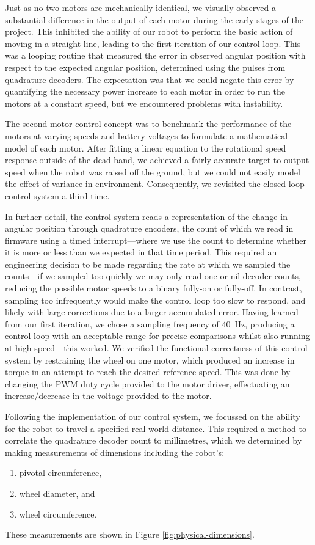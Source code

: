 \documentclass[conference]{IEEEtran}
\begin{document}
Just as no two motors are mechanically identical, we visually observed a substantial difference in the output of each motor during the early stages of the project.
This inhibited the ability of our robot to perform the basic action of moving in a straight line, leading to the first iteration of our control loop.
This was a looping routine that measured the error in observed angular position with respect to the expected angular position, determined using the pulses from quadrature decoders.
The expectation was that we could negate this error by quantifying the necessary power increase to each motor in order to run the motors at a constant speed, but we encountered problems with instability.

The second motor control concept was to benchmark the performance of the motors at varying speeds and battery voltages to formulate a mathematical model of each motor.
After fitting a linear equation to the rotational speed response outside of the dead-band, we achieved a fairly accurate target-to-output speed when the robot was raised off the ground, but we could not easily model the effect of variance in environment.
Consequently, we revisited the closed loop control system a third time.

In further detail, the control system reads a representation of the change in angular position through quadrature encoders, the count of which we read in firmware using a timed interrupt—where we use the count to determine whether it is more or less than we expected in that time period.
This required an engineering decision to be made regarding the rate at which we sampled the counts—if we sampled too quickly we may only read one or nil decoder counts, reducing the possible motor speeds to a binary fully-on or fully-off.
In contrast, sampling too infrequently would make the control loop too slow to respond, and likely with large corrections due to a larger accumulated error.
Having learned from our first iteration, we chose a sampling frequency of \qty{40}{\hertz}, producing a control loop with an acceptable range for precise comparisons whilst also running at high speed—this worked.
We verified the functional correctness of this control system by restraining the wheel on one motor, which produced an increase in torque in an attempt to reach the desired reference speed.
This was done by changing the PWM duty cycle provided to the motor driver, effectuating an increase/decrease in the voltage provided to the motor.

Following the implementation of our control system, we focussed on the ability for the robot to travel a specified real-world distance.
This required a method to correlate the quadrature decoder count to millimetres, which we determined by making measurements of dimensions including the robot's:
\begin{enumerate}
	\item pivotal circumference,
	\item wheel diameter, and
	\item wheel circumference.
\end{enumerate}
These measurements are shown in Figure \ref{fig:physical-dimensions}.
\end{document}
